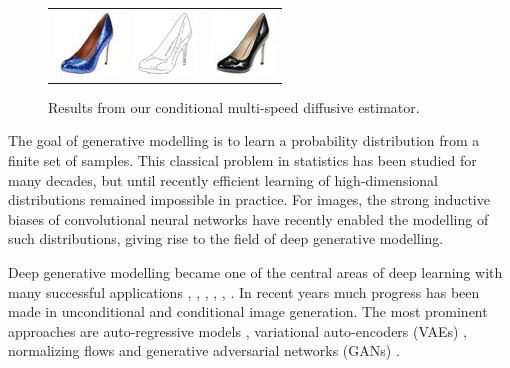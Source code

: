 \begin{figure}[h]
\begin{center}
\begin{tabular}{ccc}
        \includegraphics[width=.13\textwidth]{Chapter2/samples/teaser/189_x.png} &   
        \includegraphics[width=.13\textwidth]{Chapter2/samples/teaser/189_y.png} &
        \includegraphics[width=.13\textwidth]{Chapter2/samples/teaser/189_3.png}  \\
    \end{tabular}
    \end{center}
    \caption{Results from our conditional multi-speed diffusive estimator.}
    \label{fig: teaser}
\end{figure}

The goal of generative modelling is to learn a  probability distribution from a finite set of samples. This classical problem in statistics has been studied for many decades, but until recently efficient learning of high-dimensional distributions remained impossible in practice. For images, the strong inductive biases of convolutional neural networks have recently enabled the modelling of such distributions, giving rise to the field of deep generative modelling.

Deep generative modelling became one of the central areas of deep learning with many successful applications \cite{saharia2021sr3}, \cite{SRFLOW}, \cite{liu2023i2sb}, \cite{donahue2019adversarial_audio}, \cite{zhu2020cycle_gan}, \cite{tang2021attentiongan}.
In recent years much progress has been made in unconditional and conditional image generation.
The most prominent approaches are auto-regressive models \cite{bengio2005autoregressive}, variational auto-encoders (VAEs) \cite{kingma2014autoencoding},  normalizing flows \cite{papamakarios2021normalizing} and generative adversarial networks (GANs) \cite{goodfellow2014generative}.

